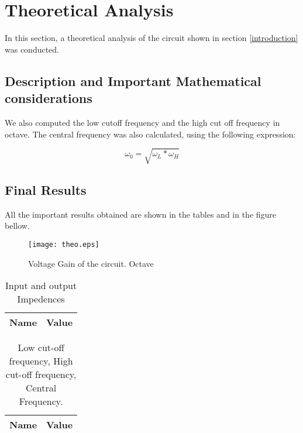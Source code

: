 \section{Theoretical Analysis} \label{section:theo}


\par In this section, a theoretical analysis of the circuit shown in section \ref{introduction} was conducted. 

\subsection{Description and Important Mathematical considerations}


We also computed the low cutoff frequency and the high cut off frequency in octave. The central frequency was also calculated, using the following expression:

\begin{equation}
\omega_{0}= \sqrt{\omega_{L} * \omega_{H}}
\end{equation}



\subsection{Final Results}
All the important results obtained are shown in the tables and in the figure bellow. 

\begin{figure}[h] \centering
\texttt{[image: theo.eps]}
\caption{Voltage Gain of the circuit. Octave}
\label{sh}
\end{figure}




\begin{table}[ht]
  \centering
  \begin{tabular}{|l|r|}
    \hline    
    {\bf Name} & {\bf Value} \\ \hline
    
  \end{tabular}
  \caption{Input and output Impedences}
  \label{tab:2}
\end{table}



\begin{table}[ht]
  \centering
  \begin{tabular}{|l|r|}
    \hline    
    {\bf Name} & {\bf Value} \\ \hline
    
  \end{tabular}
  \caption{Low cut-off frequency, High cut-off frequency, Central Frequency.}
\end{table}



